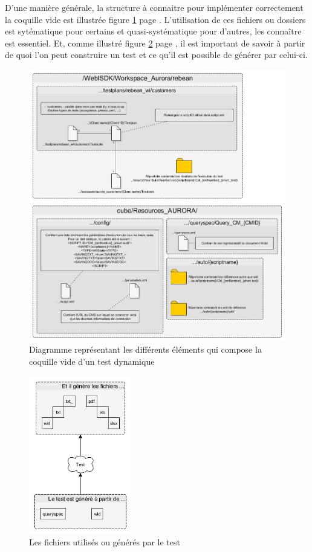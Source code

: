 D'une mani\`{e}re g\'{e}n\'{e}rale, la structure \`{a} connaitre pour impl\'{e}menter correctement la coquille vide est illustr\'{e}e figure \ref{figure:testEmptyShell} page \pageref{figure:testEmptyShell}. L'utilisation de ces fichiers ou dossiers est sytématique pour certains et quasi-systématique pour d'autres, les connaître est essentiel. Et, comme illustré figure \ref{figure:usedFilesForTests} page \pageref{figure:usedFilesForTests}, il est important de savoir à partir de quoi l'on peut construire un test et ce qu'il est possible de générer par celui-ci.\\
\begin{figure}[H]
  \centering
      \includegraphics[width=\textwidth]{images/testEmptyShell.jpg}
  \caption{Diagramme repr\'{e}sentant les diff\'{e}rents \'{e}l\'{e}ments qui compose la coquille vide d'un test dynamique}
	\label{figure:testEmptyShell}
\end{figure}
\begin{figure}[H]
  \centering
      \includegraphics[width=0.4\textwidth]{images/usedFilesForTests.jpg}
  \caption{Les fichiers utilisés ou générés par le test}
	\label{figure:usedFilesForTests}
\end{figure}

